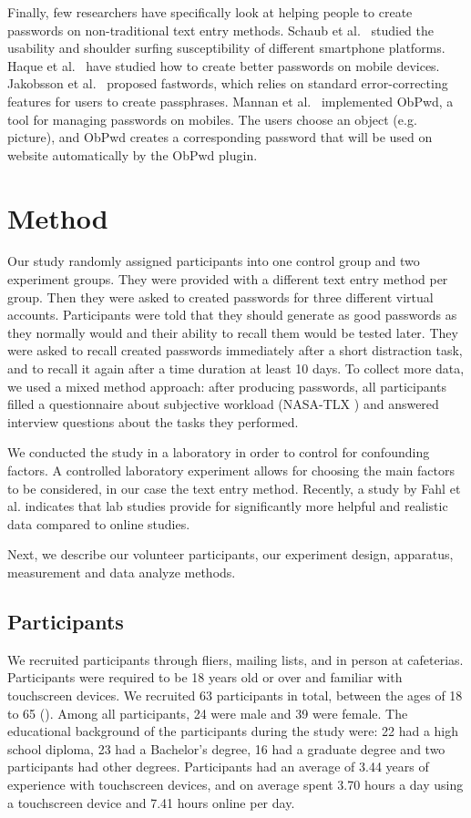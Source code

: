 \documentclass[conference]{IEEEtran}
\begin{document}
Finally, few researchers have specifically look at helping people to create passwords on non-traditional text entry methods. Schaub et al.~\cite{Schaub:2012:PEU:2406367.2406384} studied the usability and shoulder surfing susceptibility of different smartphone platforms. Haque et al.~\cite{Haque:2013:PIT:2516760.2516767} have studied how to create better passwords on mobile devices. Jakobsson et al.~\cite{rethinkingpasswords} proposed fastwords, which relies on standard error-correcting features for users to create passphrases. Mannan et al.~\cite{mohammadboth} implemented ObPwd, a tool for managing passwords on mobiles. The users choose an object (e.g. picture), and ObPwd creates a corresponding password that will be used on website automatically by the ObPwd plugin. 


\section{Method}

Our study randomly assigned participants into one control group and two experiment groups. They were provided with a different text entry method per group. Then they were asked to created passwords for three different virtual accounts. Participants were told that they should generate as good passwords as they normally would and their ability to recall them would be tested later. They were asked to recall created passwords immediately after a short distraction task, and to recall it again after a time duration at least 10 days. To collect more data, we used a mixed method approach: after producing passwords, all participants filled a questionnaire about subjective workload (NASA-TLX \cite{hart:tlx}) and answered interview questions about the tasks they performed.


We conducted the study in a laboratory in order to control for confounding factors. A controlled laboratory experiment allows for choosing the main factors to be considered, in our case the
text entry method. Recently, a study by Fahl et al.\cite{Fahl:2013:EVP:2501604.2501617} indicates that lab studies provide for significantly more helpful and realistic data compared to online studies.

Next, we describe our volunteer participants, our experiment design, apparatus, measurement and data analyze methods.

\subsection{Participants}
We recruited participants through fliers, mailing lists, and in person at cafeterias. Participants were required to be 18 years old or over and familiar with touchscreen devices. 
We recruited 63 participants in total, between the ages of 18 to 65 (). Among all participants, 24 were male and 39 were female. The educational background of the participants during the study were: 22 had a high school diploma, 23 had a Bachelor's degree, 16 had a graduate degree and two participants had other degrees. Participants had an average of 3.44 years of experience with touchscreen devices, and on average spent 3.70 hours a day using a touchscreen device and 7.41 hours online per day. 
\end{document}
